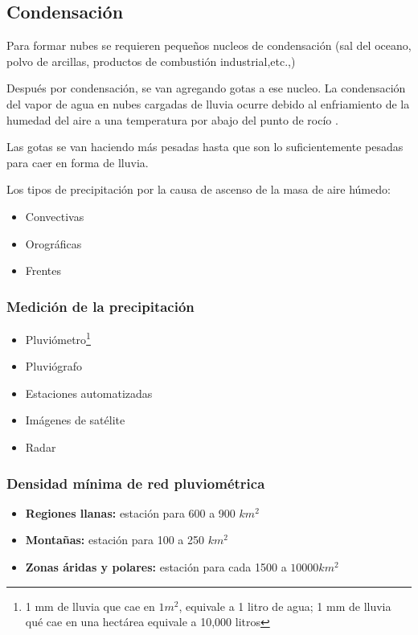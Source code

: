 \subsection{Condensación}
Para formar nubes se requieren pequeños nucleos de condensación (sal del oceano, polvo de arcillas, productos de combustión industrial,etc.,)

Después por condensación, se van agregando gotas a ese nucleo. La condensación del vapor de agua en nubes cargadas de lluvia ocurre debido al enfriamiento de la humedad del aire a una temperatura por abajo del punto de rocío .

Las gotas se van haciendo más pesadas hasta que son lo suficientemente pesadas para caer en forma de lluvia.

Los tipos de precipitación por la causa de ascenso de la masa de aire húmedo:
\begin{itemize}
    \item Convectivas
    \item Orográficas
    \item Frentes
\end{itemize}
\subsubsection{Medición de la precipitación}
\begin{itemize}
    \item Pluviómetro\footnote{1 mm de lluvia que cae en $1 m^2$, equivale a 1 litro de agua; 1 mm de lluvia qué cae en una hectárea equivale a 10,000 litros}
    \item Pluviógrafo
    \item Estaciones automatizadas
    \item Imágenes de satélite
    \item Radar
\end{itemize}

\subsubsection{Densidad mínima de red pluviométrica}
\begin{itemize}
    \item \textbf{Regiones llanas:} estación para 600 a 900 $km^2$
    \item \textbf{Montañas:} estación para 100 a 250 $km^2$
    \item \textbf{Zonas áridas y polares:} estación para cada 1500 a $10000 km^2$
\end{itemize}
